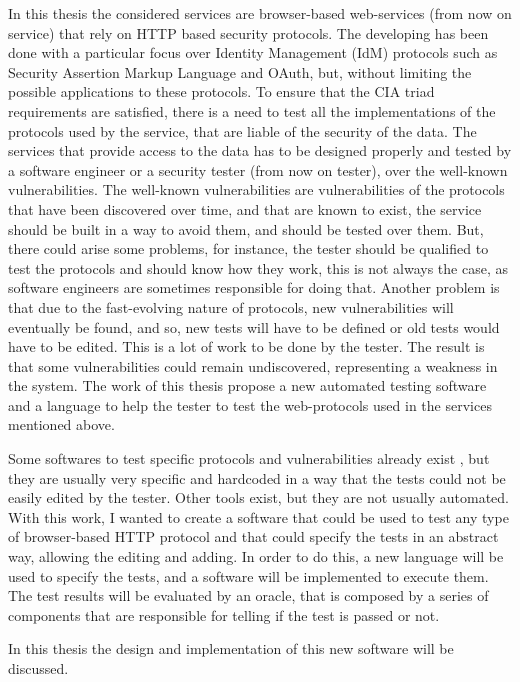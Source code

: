 In this thesis the considered services are browser-based web-services (from now on service) that rely on HTTP based security protocols. The developing has been done with a particular focus over Identity Management (IdM) protocols such as Security Assertion Markup Language and OAuth, but, without limiting the possible applications to these protocols.
To ensure that the CIA triad requirements are satisfied, there is a need to test all the implementations of the protocols used by the service, that are liable of the security of the data. The services that provide access to the data has to be designed properly and tested by a software engineer or a security tester (from now on tester), over the well-known vulnerabilities. The well-known vulnerabilities are vulnerabilities of the protocols that have been discovered over time, and that are known to exist, the service should be built in a way to avoid them, and should be tested over them. But, there could arise some problems, for instance, the tester should be qualified to test the protocols and should know how they work, this is not always the case, as software engineers are sometimes responsible for doing that. Another problem is that due to the fast-evolving nature of protocols, new vulnerabilities will eventually be found, and so, new tests will have to be defined or old tests would have to be edited. This is a lot of work to be done by the tester. The result is that some vulnerabilities could remain undiscovered, representing a weakness in the system. The work of this thesis propose a new automated testing software and a language to help the tester to test the web-protocols used in the services mentioned above. 

Some softwares to test specific protocols and vulnerabilities already exist \cite{wendy_barreto,claudio_grisenti}, but they are usually very specific and hardcoded in a way that the tests could not be easily edited by the tester. Other tools exist, but they are not usually automated. With this work, I wanted to create a software that could be used to test any type of browser-based HTTP protocol and that could specify the tests in an abstract way, allowing the editing and adding. In order to do this, a new language will be used to specify the tests, and a software will be implemented to execute them. The test results will be evaluated by an oracle, that is composed by a series of components that are responsible for telling if the test is passed or not.

In this thesis the design and implementation of this new software will be discussed.

